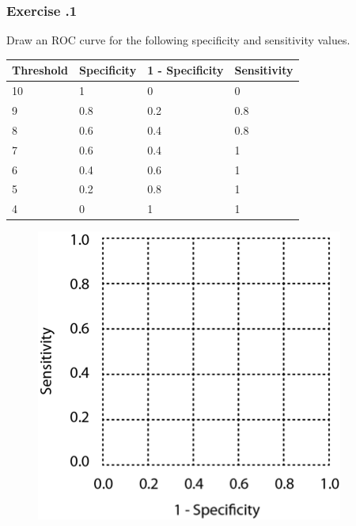 %
%
\subsubsection*{Exercise \thesection.1}
Draw an ROC curve for the following specificity and sensitivity values.

\begin{table}[H]
\centering
\begin{tabular}{|l|l|l|l|}
\hline
Threshold & Specificity & 1 - Specificity & Sensitivity \\ \hline
10        & 1           & 0               & 0           \\ \hline
9         & 0.8         & 0.2             & 0.8         \\ \hline
8         & 0.6         & 0.4             & 0.8         \\ \hline
7         & 0.6         & 0.4             & 1           \\ \hline
6         & 0.4         & 0.6             & 1           \\ \hline
5         & 0.2         & 0.8             & 1           \\ \hline
4         & 0           & 1               & 1           \\ \hline
\end{tabular}
\end{table}

\begin{figure}[H]
  \centering
      \includegraphics[width=0.4 \textwidth]{fig07/roc.png}
\end{figure}

\bigskip 

%
